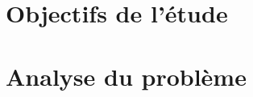 \documentclass[12pt,fleqn]{report} %
\begin{document}
\renewcommand{\contentsname}{Sommaire}                %
\renewcommand{\glossaryname}{Glossaire}               %




\newpage


\tableofcontents  %
\cleardoublepage  %


%
%


\chapter{Objectifs de l'étude}


\chapter{Analyse du problème}


\end{document}
